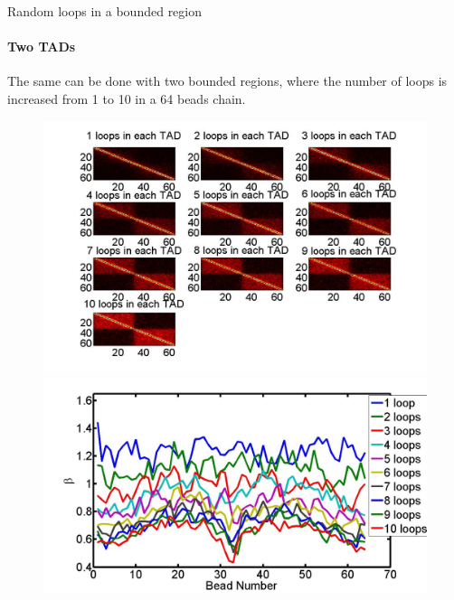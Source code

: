 \documentclass[8pt]{beamer}
\begin{document}
\begin{frame}{Random loops in a bounded region}
\framesubtitle{Two TADs}
The same can be done with two bounded regions, where the number of loops is increased from 1 to 10 in a 64 beads chain. 
\begin{figure}[H]
\includegraphics[scale=0.15]{encounterHistogram1To10LoopsInEachTAD}
\includegraphics[scale=0.13]{fittedExpTwoTADs1To10Loops}
\end{figure}
\end{frame}
\end{document}

